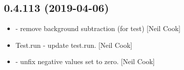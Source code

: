 \documentclass[a4paper,10pt,english]{report}
\begin{document}
\subsection{0.4.113 (2019-04-06)}
\label{\detokenize{misc/changelog:id147}}\begin{itemize}
\item {} 
 - remove background subtraction (for test) {[}Neil
Cook{]}

\item {} 
Test.run - update test.run. {[}Neil Cook{]}

\item {} 
 - unfix negative values set to zero. {[}Neil Cook{]}

\end{itemize}
\end{document}
